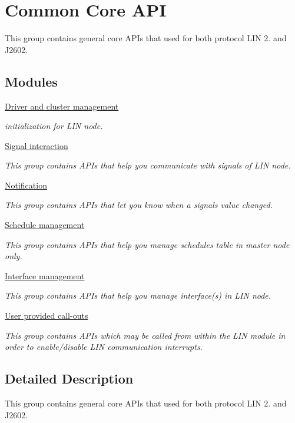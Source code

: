 \hypertarget{group__common__core__api__group}{}\section{Common Core A\+P\+I}
\label{group__common__core__api__group}


This group contains general core A\+P\+Is that used for both protocol L\+I\+N 2. and J2602.  


\subsection*{Modules}
\begin{DoxyCompactItemize}
\item 
\hyperlink{group__driver__cluster__group}{Driver and cluster management}
\begin{DoxyCompactList}\small\item\em initialization for L\+I\+N node. \end{DoxyCompactList}\item 
\hyperlink{group__signal__interract__group}{Signal interaction}
\begin{DoxyCompactList}\small\item\em This group contains A\+P\+Is that help you communicate with signals of L\+I\+N node. \end{DoxyCompactList}\item 
\hyperlink{group__notification__group}{Notification}
\begin{DoxyCompactList}\small\item\em This group contains A\+P\+Is that let you know when a signal\textquotesingle{}s value changed. \end{DoxyCompactList}\item 
\hyperlink{group__schedule__management__group}{Schedule management}
\begin{DoxyCompactList}\small\item\em This group contains A\+P\+Is that help you manage schedules table in master node only. \end{DoxyCompactList}\item 
\hyperlink{group__interface__management__group}{Interface management}
\begin{DoxyCompactList}\small\item\em This group contains A\+P\+Is that help you manage interface(s) in L\+I\+N node. \end{DoxyCompactList}\item 
\hyperlink{group__call__out__group}{User provided call-\/outs}
\begin{DoxyCompactList}\small\item\em This group contains A\+P\+Is which may be called from within the L\+I\+N module in order to enable/disable L\+I\+N communication interrupts. \end{DoxyCompactList}\end{DoxyCompactItemize}


\subsection{Detailed Description}
This group contains general core A\+P\+Is that used for both protocol L\+I\+N 2. and J2602. 

